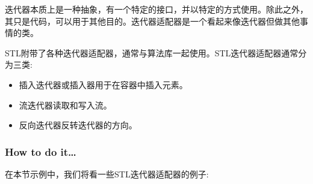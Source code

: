 
迭代器本质上是一种抽象，有一个特定的接口，并以特定的方式使用。除此之外，其只是代码，可以用于其他目的。迭代器适配器是一个看起来像迭代器但做其他事情的类。

STL附带了各种迭代器适配器，通常与算法库一起使用。STL迭代器适配器通常分为三类:

\begin{itemize}
\item 
插入迭代器或插入器用于在容器中插入元素。

\item 
流迭代器读取和写入流。

\item 
反向迭代器反转迭代器的方向。
\end{itemize}

\subsubsection{How to do it…}

在本节示例中，我们将看一些STL迭代器适配器的例子:

